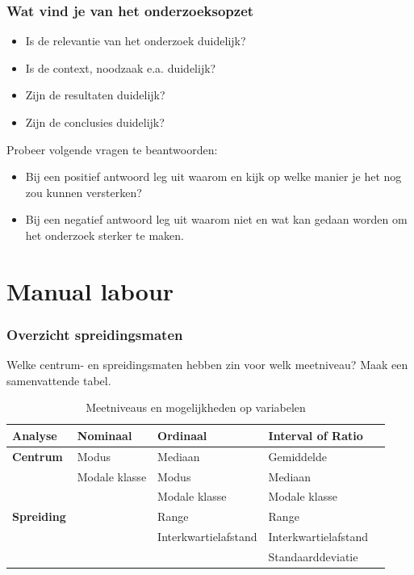 \documentclass{beamer}
\newif\ifoplossing
\begin{document}
\begin{frame}
	\frametitle{Wat vind je van het onderzoeksopzet}
	\begin{itemize}
		\item Is de relevantie van het onderzoek duidelijk?
		\item Is de context, noodzaak e.a. duidelijk?
		\item Zijn de resultaten duidelijk?
		\item Zijn de conclusies duidelijk?  
	\end{itemize}
	
	Probeer volgende vragen te beantwoorden:
	\begin{itemize}
		\item Bij een positief antwoord leg uit waarom en kijk op welke manier je het nog zou kunnen versterken?
		\item Bij een negatief antwoord leg uit waarom niet en wat kan gedaan worden om het onderzoek sterker te maken.
	\end{itemize}
\end{frame}



\section{Manual labour}

\begin{frame}
	\frametitle{Overzicht spreidingsmaten}
	Welke centrum- en spreidingsmaten hebben zin voor welk
	meetniveau? Maak een samenvattende tabel.
\end{frame}

\ifoplossing
\begin{frame}
	\begin{table}[htbp]
  \centering
  \begin{tabular}{|l|l|l|l|l|}
    \hline
    \textbf{Analyse} & \textbf{Nominaal} & \textbf{Ordinaal} & \textbf{Interval} of \textbf{Ratio} \\
    \hline
    \textbf{Centrum} & Modus & Mediaan & Gemiddelde \\
    & Modale klasse & Modus & Mediaan \\
    & & Modale klasse & Modale klasse \\
    \hline
    \textbf{Spreiding} & & Range & Range \\
    & & Interkwartielafstand & Interkwartielafstand \\
    & & & Standaarddeviatie \\
    \hline
  \end{tabular}
  \caption{Meetniveaus en mogelijkheden op variabelen}
  \label{tab:Meetniveaus}
\end{table}
\end{frame}
\end{document}
